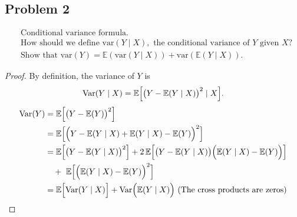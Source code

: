 \documentclass[letterpaper, 11pt]{article}
\newcommand{\1}{\mathds{1}}	%
\theoremstyle{definition}
\begin{document}
\subsection*{Problem 2}
\begin{align*}
    &\text{Conditional variance formula.} \\
    &\text{How should we define var}(Y \mid X), \text{ the conditional variance of } Y \text{ given } X\text{?} \\
    &\text{Show that var}(Y) = \mathbb{E}(\text{var}(Y \mid X)) + \text{var}(\mathbb{E}(Y \mid X)).
    \end{align*}
\begin{proof}
By definition, the variance of \(Y\) is
\[
\operatorname{Var}(Y\mid X) = \mathbb{E}\Bigl[\bigl(Y - \mathbb{E}(Y\mid X)\bigr)^2\mid X\Bigr].
\]
\begin{align*}
\operatorname{Var}(Y)
&=\mathbb{E}\Bigl[\bigl(Y-\mathbb{E}(Y)\bigr)^2\Bigr] \\
&=\mathbb{E}\Bigl[\Bigl(Y-\mathbb{E}(Y\mid X)+\mathbb{E}(Y\mid X)-\mathbb{E}(Y)\Bigr)^2\Bigr] \\
&=\mathbb{E}\Bigl[\bigl(Y-\mathbb{E}(Y\mid X)\bigr)^2\Bigr]
+ 2\,\mathbb{E}\Bigl[\bigl(Y-\mathbb{E}(Y\mid X)\bigr)\Bigl(\mathbb{E}(Y\mid X)-\mathbb{E}(Y)\Bigr)\Bigr] \\
&\quad+\,\,\mathbb{E}\Bigl[\Bigl(\mathbb{E}(Y\mid X)-\mathbb{E}(Y)\Bigr)^2\Bigr] \\
&=\mathbb{E}\Bigl[\operatorname{Var}(Y\mid X)\Bigr]
+ \operatorname{Var}\Bigl(\mathbb{E}(Y\mid X)\Bigr) \text{ (The cross products are zeros)}
\end{align*}
\end{proof}
\end{document}
